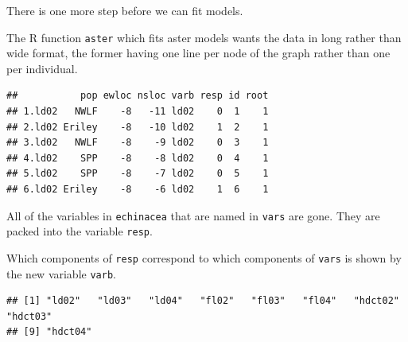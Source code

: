 \documentclass[
  ignorenonframetext,
]{beamer}
\newenvironment{Shaded}{\begin{snugshade}}{\end{snugshade}}
\newcommand{\AttributeTok}[1]{\textcolor[rgb]{0.13,0.29,0.53}{#1}}
\newcommand{\DecValTok}[1]{\textcolor[rgb]{0.00,0.00,0.81}{#1}}
\newcommand{\DocumentationTok}[1]{\textcolor[rgb]{0.56,0.35,0.01}{\textbf{\textit{#1}}}}
\newcommand{\FunctionTok}[1]{\textcolor[rgb]{0.13,0.29,0.53}{\textbf{#1}}}
\newcommand{\NormalTok}[1]{#1}
\newcommand{\OtherTok}[1]{\textcolor[rgb]{0.56,0.35,0.01}{#1}}
\newcommand{\SpecialCharTok}[1]{\textcolor[rgb]{0.81,0.36,0.00}{\textbf{#1}}}
\begin{document}
\begin{frame}[fragile]{}
\protect\hypertarget{section-13}{}
There is one more step before we can fit models.

The R function \texttt{aster} which fits aster models wants the data in
long rather than wide format, the former having one line per node of the
graph rather than one per individual.

\vspace{12pt}
\tiny

\begin{Shaded}
\end{Shaded}

\begin{verbatim}
##           pop ewloc nsloc varb resp id root
## 1.ld02   NWLF    -8   -11 ld02    0  1    1
## 2.ld02 Eriley    -8   -10 ld02    1  2    1
## 3.ld02   NWLF    -8    -9 ld02    0  3    1
## 4.ld02    SPP    -8    -8 ld02    0  4    1
## 5.ld02    SPP    -8    -7 ld02    0  5    1
## 6.ld02 Eriley    -8    -6 ld02    1  6    1
\end{verbatim}
\end{frame}

\begin{frame}[fragile]{}
\protect\hypertarget{section-14}{}
All of the variables in \texttt{echinacea} that are named in
\texttt{vars} are gone. They are packed into the variable \texttt{resp}.

Which components of \texttt{resp} correspond to which components of
\texttt{vars} is shown by the new variable \texttt{varb}.

\vspace{12pt}
\tiny

\begin{Shaded}
\end{Shaded}

\begin{verbatim}
## [1] "ld02"   "ld03"   "ld04"   "fl02"   "fl03"   "fl04"   "hdct02" "hdct03"
## [9] "hdct04"
\end{verbatim}
\end{frame}
\end{document}

